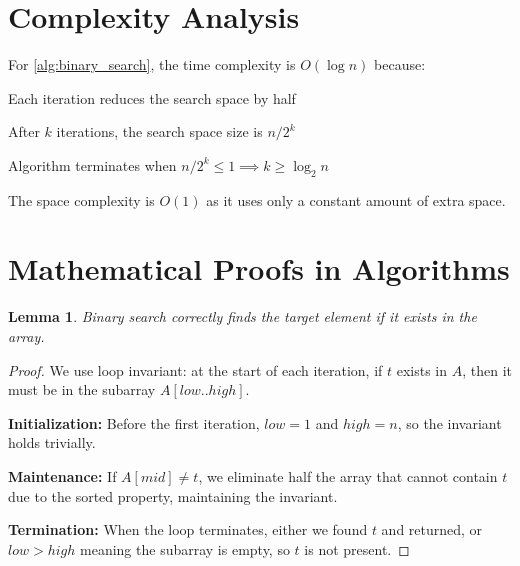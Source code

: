 \documentclass[12pt]{article}
\newtheorem{lemma}[theorem]{Lemma}
\theoremstyle{definition}
\theoremstyle{remark}
\begin{document}
\section{Complexity Analysis}

For \cref{alg:binary_search}, the time complexity is $O(\log n)$ because:
\item Each iteration reduces the search space by half
    \item After $k$ iterations, the search space size is $n/2^k$
    \item Algorithm terminates when $n/2^k \leq 1 \implies k \geq \log_2 n$

The space complexity is $O(1)$ as it uses only a constant amount of extra space.

\section{Mathematical Proofs in Algorithms}

\begin{lemma}
Binary search correctly finds the target element if it exists in the array.
\end{lemma}

\begin{proof}
We use loop invariant: at the start of each iteration, if $t$ exists in $A$, 
then it must be in the subarray $A[low..high]$.

\textbf{Initialization:} Before the first iteration, $low = 1$ and $high = n$, 
so the invariant holds trivially.

\textbf{Maintenance:} If $A[mid] \neq t$, we eliminate half the array that 
cannot contain $t$ due to the sorted property, maintaining the invariant.

\textbf{Termination:} When the loop terminates, either we found $t$ and returned, 
or $low > high$ meaning the subarray is empty, so $t$ is not present.
\end{proof}
\end{document}
